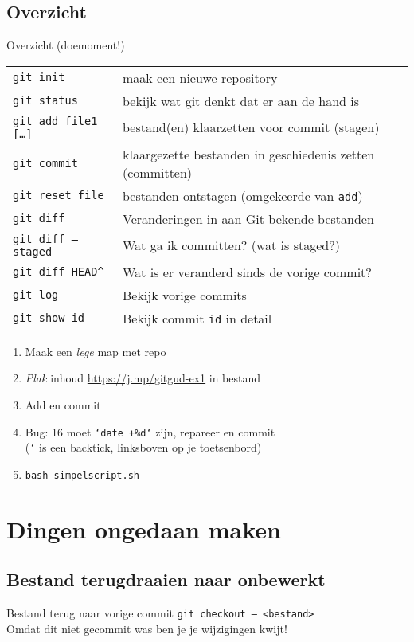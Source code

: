 \subsection{Overzicht}
\begin{frame}{Overzicht (doemoment!)}
	{ \footnotesize
	\begin{tabular}{ll}
		\texttt{git init}						& maak een nieuwe repository \\
		\texttt{git status} 					& bekijk wat git denkt dat er aan de hand is \\
		\texttt{git add file1 [\ldots]}			& bestand(en) klaarzetten voor commit (stagen)	\\
		\texttt{git commit} 					& klaargezette bestanden in geschiedenis zetten (committen)\\
		\texttt{git reset file}		    		& bestanden ontstagen (omgekeerde van \texttt{add})	\\
		\hline
		\texttt{git diff}						& Veranderingen in aan Git bekende bestanden		\\
		\texttt{git diff --staged}				& Wat ga ik committen? (wat is staged?)				\\
		\texttt{git diff HEAD\^}				& Wat is er veranderd sinds de vorige commit?		\\
		\hline
		\texttt{git log}						& Bekijk vorige commits								\\
		\texttt{git show id}					& Bekijk commit \texttt{id} in detail
	\end{tabular}
	}
	\begin{enumerate}
		\item Maak een \emph{lege} map met repo
		\item \emph{Plak} inhoud \url{https://j.mp/gitgud-ex1} in bestand
		\item Add en commit
		\item Bug: 16 moet \texttt{`date +\%d`} zijn, repareer en commit \\
			(\texttt{`} is een backtick, linksboven op je toetsenbord)
		\item \texttt{bash simpelscript.sh}
	\end{enumerate}
\end{frame}

\section[Ongedaan]{Dingen ongedaan maken}

\subsection{Bestand terugdraaien naar onbewerkt}
\begin{frame}{Bestand terug naar vorige commit}
	\texttt{git checkout -- <bestand>} \\
	\alert{Omdat dit niet gecommit was ben je je wijzigingen kwijt!}
\end{frame}

